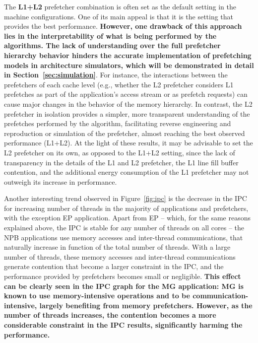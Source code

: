\documentclass[AMA,final,STIX1COL]{WileyNJD-v2}
\newcommand\new[1]{{\color{red}\textbf{#1}}}
\begin{document}
The \new{L1+L2} prefetcher combination is often set as the default setting in the machine configurations.
One of its main appeal is that it is the setting that provides the best performance. 
\new{However, one drawback of this approach lies in the interpretability of what is being performed by the algorithms.
The lack of understanding over the full prefetcher hierarchy behavior hinders the accurate implementation of prefetching models in architecture simulators, which will be demonstrated in detail in Section~\ref{sec:simulation}}.
For instance, the interactions between the prefetchers of each cache level (e.g., whether the L2 prefetcher considers L1 prefetches as part of the application's access stream or as prefetch requests) can cause major changes in the behavior of the memory hierarchy.
In contrast, the L2 prefetcher in isolation provides a simpler, more transparent understanding of the prefetches performed by the algorithm, facilitating reverse engineering and reproduction or simulation of the prefetcher, almost reaching the best observed performance (L1+L2).
At the light of these results, it may be advisable to set the L2 prefetcher on its own, as opposed to the L1+L2 setting, since the lack of transparency in the details of the L1 and L2 prefetcher, the L1 line fill buffer contention, and the additional energy consumption of the L1 prefetcher may not outweigh its increase in performance.



Another interesting trend observed in Figure~\ref{fig:ipc} is the decrease in the IPC for increasing number of threads in the majority of applications and prefetchers, with the exception EP application.
Apart from EP -- which, for the same reasons explained above, the IPC is stable for any number of threads on all cores -- the NPB applications use memory accesses and inter-thread communications, that naturally increase in function of the total number of threads. 
With a large number of threads, these memory accesses and inter-thread communications generate contention that become a larger constraint in the IPC, and the performance provided by prefetchers becomes small or negligible. 
\new{This effect can be clearly seen in the IPC graph for the MG application: MG is known to use memory-intensive operations and to be communication-intensive, largely benefiting from memory prefetchers. 
However, as the number of threads increases, the contention becomes a more considerable constraint in the IPC results, significantly harming the performance.}
\end{document}
